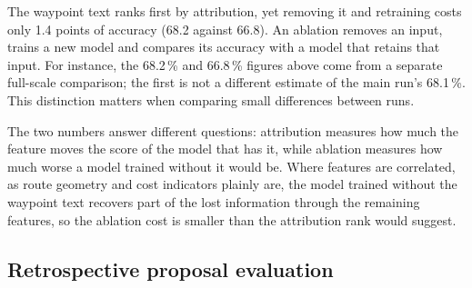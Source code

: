 \documentclass[a4paper,conference]{IEEEtran}
\begin{document}
The waypoint text ranks first by attribution, yet removing it and
retraining costs only 1.4 points of accuracy (68.2 against 66.8).
An ablation removes an input, trains a new model and compares its accuracy
with a model that retains that input. For instance, the 68.2\,\% and
66.8\,\% figures above come from a separate full-scale comparison;
the first is not a different estimate of the main run's 68.1\,\%.
This distinction matters when comparing small differences between runs.

The two numbers answer different questions: attribution measures how much
the feature moves the score of the model that has it, while ablation
measures how much worse a model trained without it would be. Where
features are correlated, as route geometry and cost indicators plainly
are, the model trained without the waypoint text recovers part of the
lost information through the remaining features, so the ablation cost is
smaller than the attribution rank would suggest.

\subsection{Retrospective proposal evaluation}

\end{document}
